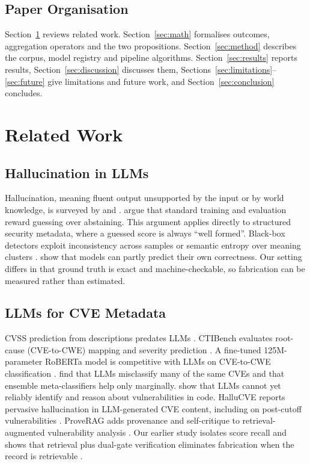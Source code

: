 \documentclass[11pt]{article}
\begin{document}
\subsection{Paper Organisation}
Section~\ref{sec:related} reviews related work. Section~\ref{sec:math} formalises outcomes, aggregation operators and the two propositions. Section~\ref{sec:method} describes the corpus, model registry and pipeline algorithms. Section~\ref{sec:results} reports results, Section~\ref{sec:discussion} discusses them, Sections~\ref{sec:limitations}--\ref{sec:future} give limitations and future work, and Section~\ref{sec:conclusion} concludes.

\section{Related Work}\label{sec:related}

\subsection{Hallucination in LLMs}
Hallucination, meaning fluent output unsupported by the input or by world knowledge, is surveyed by \citet{ji2023survey} and \citet{huang2025survey}. \citet{kalai2025hallucinate} argue that standard training and evaluation reward guessing over abstaining. This argument applies directly to structured security metadata, where a guessed score is always ``well formed''. Black-box detectors exploit inconsistency across samples \citep{manakul2023selfcheckgpt} or semantic entropy over meaning clusters \citep{farquhar2024semantic}. \citet{kadavath2022know} show that models can partly predict their own correctness. Our setting differs in that ground truth is exact and machine-checkable, so fabrication can be measured rather than estimated.

\subsection{LLMs for CVE Metadata}
CVSS prediction from descriptions predates LLMs \citep{shahid2021cvssbert}. CTIBench evaluates root-cause (CVE-to-CWE) mapping and severity prediction \citep{alam2024ctibench}. A fine-tuned 125M-parameter RoBERTa model is competitive with LLMs on CVE-to-CWE classification \citep{mosievskiy2026roberta}. \citet{jafarikhah2025description} find that LLMs misclassify many of the same CVEs and that ensemble meta-classifiers help only marginally. \citet{ullah2024llms} show that LLMs cannot yet reliably identify and reason about vulnerabilities in code. HalluCVE reports pervasive hallucination in LLM-generated CVE content, including on post-cutoff vulnerabilities \citep{dao2026hallucve}. ProveRAG adds provenance and self-critique to retrieval-augmented vulnerability analysis \citep{fayyazi2025proverag}. Our earlier study isolates score recall and shows that retrieval plus dual-gate verification eliminates fabrication when the record is retrievable \citep{anon2026grounding}.
\end{document}

